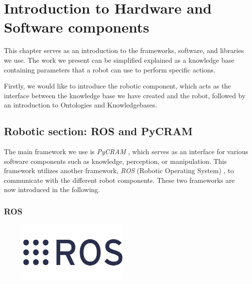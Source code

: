     \chapter{Introduction to Hardware and Software components}
    This chapter serves as an introduction to the frameworks, software, and libraries we use. The work we present can be simplified explained as a knowledge base containing parameters that a robot can use to perform specific actions.

    Firstly, we would like to introduce the robotic component, which acts as the interface between the knowledge base we have created and the robot, followed by an introduction to Ontologies and Knowledgebases.
    \section{Robotic section: ROS and PyCRAM}
    
    The main framework we use is \textit{PyCRAM} \cite{pycram}, which serves as an interface for various software components such as knowledge, perception, or manipulation. 
	This framework utilizes another framework, \textit{ROS} (Robotic Operating System) \cite{ros}, to communicate with the different robot components. These two frameworks are now introduced in the following.    
    \subsection{ROS}
    \begin{figure}
        \centering
        \includegraphics[width=0.48\textwidth]{Graphics/ROS.jpg}
    \end{figure}

